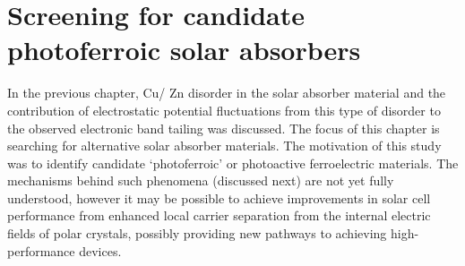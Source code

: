 \documentclass[11pt, twoside]{report}
\begin{document}








\chapter{Screening for candidate photoferroic solar absorbers}\label{chap:screening}

In the previous chapter, Cu/ Zn disorder in the solar absorber material {\CZTS} and the contribution of electrostatic potential fluctuations from this type of disorder to the observed electronic band tailing was discussed. The focus of this chapter is searching for alternative solar absorber materials. The motivation of this study was to identify candidate `photoferroic' or photoactive ferroelectric materials. The mechanisms behind such phenomena (discussed next) are not yet fully understood, however it may be possible to achieve improvements in solar cell performance from enhanced local carrier separation from the internal electric fields of polar crystals, possibly providing new pathways to achieving high-performance devices.
\end{document}
